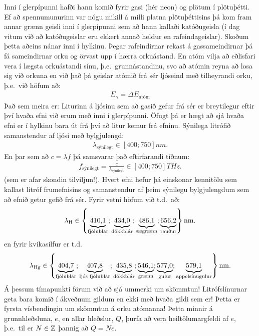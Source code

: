 \ifdefined \wholebook \else\documentclass[oneside]{book}\usepackage{EdlBook}\graphicspath{{figures/}}
\begin{document}
Inni í glerpípunni hafði hann komið fyrir gasi (hér neon) og plötum í plötuþétti. Ef að spennumunurinn var nógu mikill á milli platna plötuþéttisins þá kom fram annar grænn geisli inni í glerpípunni sem að hann kallaði katóðugeisla (í dag vitum við að katóðugeislar eru ekkert annað heldur en rafeindageislar). Skoðum þetta aðeins nánar inni í hylkinu. Þegar rafeindirnar rekast á gassameindirnar þá fá sameindirnar orku og örvast upp í hærra orkuástand. En atóm vilja að eðlisfari vera í lægsta orkuástandi sínu, þ.e.~grunnástandinu, svo að atómin reyna að losa sig við orkuna en við það þá geislar atómið frá sér ljóseind með tilheyrandi orku, þ.e.~við höfum að:
\begin{align*}
    E_{\gamma} = \Delta E_{\text{atóm}}
\end{align*}
Það sem meira er: Liturinn á ljósinu sem að gasið gefur frá sér er breytilegur eftir því hvaða efni við erum með inni í glerpípunni. Öfugt þá er hægt að sjá hvaða efni er í hylkinu bara út frá því að litur kemur frá efninu. Sýnilega litrófið samanstendur af ljósi með bylgjulengd:
\begin{align*}
    \lambda_{\text{sýnilegt}} \in \left[ 400;750 \right] \si{nm}.
\end{align*}
En þar sem að $c = \lambda f$ þá samsvarar það eftirfarandi tíðnum:
\begin{align*}
    f_{\text{sýnilegt}} = \frac{c}{\lambda_{\text{sýnilegt}}}  \in \left[ 400; 750 \right] \si{THz}.
\end{align*}
(sem er afar skondin tilviljun!). Hvert efni hefur þá einskonar kennitölu sem kallast litróf frumefnisins og samanstendur af þeim sýnilegu bylgjulengdum sem að efnið getur gefið frá sér. Fyrir vetni höfum við t.d.~að:
\begin{align*}
    \lambda_{\text{H}} \in \left\{ \explain{\SI{410,1}{}}{\text{fjólublár}}; \explain{\SI{434,0}{}}{\text{dökkblár}}; \explain{\SI{486,1}{}}{\text{sægrænn}}; \explain{\SI{656,2}{}}{\text{rauður}} \right\} \si{nm}.
\end{align*}
en fyrir kvikasilfur er t.d.~
\begin{align*}
    \lambda_{\text{Hg}} \in \left\{ \explain{\SI{404,7}{}}{\text{fjólublár}}; \explain{\SI{407,8}{}}{\text{ljós fjólublár}}; \explain{\SI{435,8}{}}{\text{dökkblár}}; \explain{\SI{546,1}{}}{\text{grænn}}; \explain{\SI{577,0}{}}{\text{gulur}}; \explain{\SI{579.1}{}}{\text{appelsínugulur}}\right\} \si{nm}.
\end{align*}
Á þessum tímapunkti förum við að sjá ummerki um skömmtun! Litrófslínurnar geta bara komið í ákveðnum gildum en ekki með hvaða gildi sem er! Þetta er fyrsta vísbendingin um skömmtun á orku atómanna! Þetta minnir á grunnhleðsluna, $e$, en allar hleðslur, $Q$, þurfa að vera heiltölumargfeldi af $e$, þ.e.~til er $N \in \Z$ þannig að $Q = Ne$.
\end{document}
